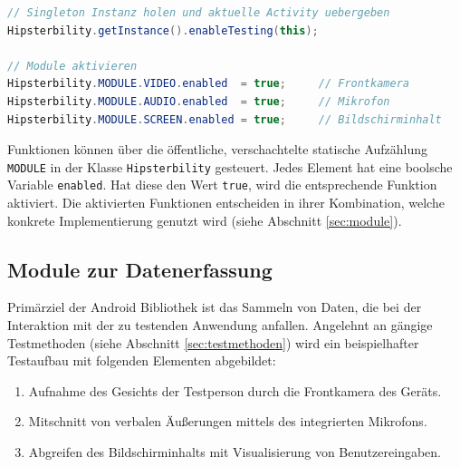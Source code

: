 \begin{lstlisting}[label=list_hipsterbility_client_init,language=Java, caption=Beispiel für Initialisierung der Android-Bibliothek]
// Singleton Instanz holen und aktuelle Activity uebergeben
Hipsterbility.getInstance().enableTesting(this);

// Module aktivieren
Hipsterbility.MODULE.VIDEO.enabled 	= true; 	// Frontkamera
Hipsterbility.MODULE.AUDIO.enabled 	= true;		// Mikrofon
Hipsterbility.MODULE.SCREEN.enabled = true;		// Bildschirminhalt
\end{lstlisting}

Funktionen können über die öffentliche, verschachtelte statische Aufzählung \texttt{MODULE} in der Klasse \texttt{Hipsterbility} gesteuert.
Jedes Element hat eine boolsche Variable \texttt{enabled}.
Hat diese den Wert \texttt{true}, wird die entsprechende Funktion aktiviert.
Die aktivierten Funktionen entscheiden in ihrer Kombination, welche konkrete Implementierung genutzt wird (siehe Abschnitt \ref{sec:module}).

\pagebreak

\subsection{Module zur Datenerfassung \label{sec:module}}
Primärziel der Android Bibliothek ist das Sammeln von Daten, die bei der Interaktion mit der zu testenden Anwendung anfallen.
Angelehnt an gängige Testmethoden (siehe Abschnitt \ref{sec:testmethoden}) wird ein beispielhafter Testaufbau mit folgenden Elementen abgebildet:
\begin{enumerate}
	\item Aufnahme des Gesichts der Testperson durch die Frontkamera des Geräts.
	\item Mitschnitt von verbalen Äußerungen mittels des integrierten Mikrofons.
	\item Abgreifen des Bildschirminhalts mit Visualisierung von Benutzereingaben.
\end{enumerate}

